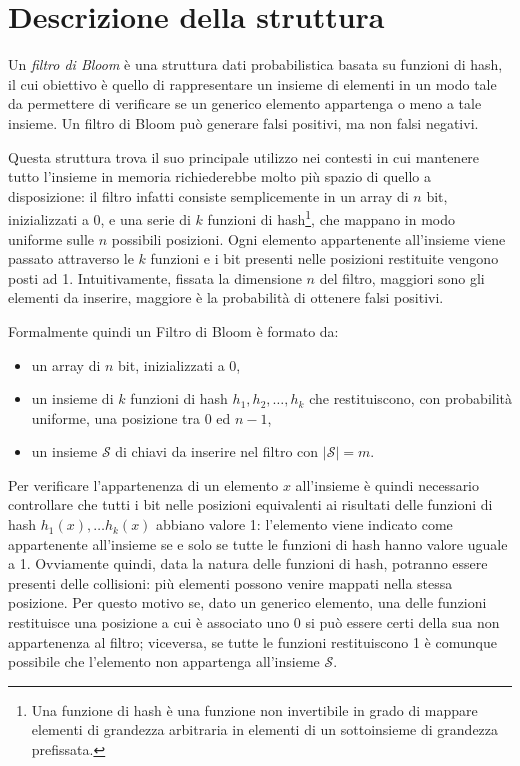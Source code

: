 \documentclass[../../main.tex]{subfiles}
\begin{document}
\section{Descrizione della struttura}
\label{sec:BFStruttura}
Un \textit{filtro di Bloom} \cite{Bloom1970SpacetimeTI} è una struttura dati probabilistica basata su funzioni di hash, il cui obiettivo è quello di rappresentare un insieme di elementi in un modo tale da permettere di verificare se un generico elemento appartenga o meno a tale insieme. Un filtro di Bloom può generare falsi positivi, ma non falsi negativi.

Questa struttura trova il suo principale utilizzo nei contesti in cui mantenere tutto l'insieme in memoria richiederebbe molto più spazio di quello a disposizione: il filtro infatti consiste semplicemente in un array di $n$ bit, inizializzati a $0$, e una serie di $k$ funzioni di hash\footnote{Una funzione di hash è una funzione non invertibile in grado di mappare elementi di grandezza arbitraria in elementi di un sottoinsieme di grandezza prefissata.}, che mappano in modo uniforme sulle $n$ possibili posizioni. Ogni elemento appartenente all'insieme viene passato attraverso le $k$ funzioni e i bit presenti nelle posizioni restituite vengono posti ad 1. Intuitivamente, fissata la dimensione $n$ del filtro, maggiori sono gli elementi da inserire, maggiore è la probabilità di ottenere falsi positivi.

Formalmente quindi un Filtro di Bloom è formato da:
    \begin{itemize}
        \item un array di $n$ bit, inizializzati a 0,
        \item un insieme di $k$ funzioni di hash $h_1, h_2, \dots, h_k$ che restituiscono, con probabilità uniforme, una posizione tra $0$ ed $n-1$,
        \item un insieme $\mathcal{S}$ di chiavi da inserire nel filtro con $|\mathcal{S}| = m$.
    \end{itemize}
Per verificare l'appartenenza di un elemento $x$ all'insieme è quindi necessario controllare che tutti i bit nelle posizioni equivalenti ai risultati delle funzioni di hash $h_1(x), \dots h_k(x)$ abbiano valore 1: l'elemento viene indicato come appartenente all'insieme se e solo se tutte le funzioni di hash hanno valore uguale a 1. Ovviamente quindi, data la natura delle funzioni di hash, potranno essere presenti delle collisioni: più elementi possono venire mappati nella stessa posizione. Per questo motivo se, dato un generico elemento, una delle funzioni restituisce una posizione a cui è associato uno 0 si può essere certi della sua non appartenenza al filtro; viceversa, se tutte le funzioni restituiscono 1 è comunque possibile che l'elemento non appartenga all'insieme $\mathcal{S}$.
\end{document}
